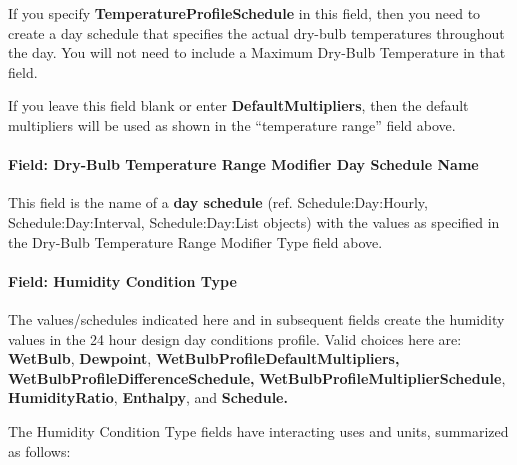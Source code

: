 If you specify \textbf{TemperatureProfileSchedule} in this field, then you need to create a day schedule that specifies the actual dry-bulb temperatures throughout the day. You will not need to include a Maximum Dry-Bulb Temperature in that field.

If you leave this field blank or enter \textbf{DefaultMultipliers}, then the default multipliers will be used as shown in the ``temperature range'' field above.

\paragraph{Field: Dry-Bulb Temperature Range Modifier Day Schedule Name}\label{field-dry-bulb-temperature-range-modifier-day-schedule-name}

This field is the name of a \textbf{day schedule} (ref. Schedule:Day:Hourly, Schedule:Day:Interval, Schedule:Day:List objects) with the values as specified in the Dry-Bulb Temperature Range Modifier Type field above.

\paragraph{Field: Humidity Condition Type}\label{field-humidity-condition-type}

The values/schedules indicated here and in subsequent fields create the humidity values in the 24 hour design day conditions profile. Valid choices here are: \textbf{WetBulb}, \textbf{Dewpoint}, \textbf{WetBulbProfileDefaultMultipliers, WetBulbProfileDifferenceSchedule,} \textbf{WetBulbProfileMultiplierSchedule}, \textbf{HumidityRatio}, \textbf{Enthalpy}, and \textbf{Schedule.}

The Humidity Condition Type fields have interacting uses and units, summarized as follows:

